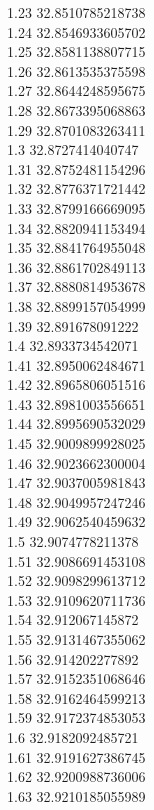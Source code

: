 {1.23	32.8510785218738\\
1.24	32.8546933605702\\
1.25	32.8581138807715\\
1.26	32.8613535375598\\
1.27	32.8644248595675\\
1.28	32.8673395068863\\
1.29	32.8701083263411\\
1.3	32.8727414040747\\
1.31	32.8752481154296\\
1.32	32.8776371721442\\
1.33	32.8799166669095\\
1.34	32.8820941153494\\
1.35	32.8841764955048\\
1.36	32.8861702849113\\
1.37	32.8880814953678\\
1.38	32.8899157054999\\
1.39	32.891678091222\\
1.4	32.8933734542071\\
1.41	32.8950062484671\\
1.42	32.8965806051516\\
1.43	32.8981003556651\\
1.44	32.8995690532029\\
1.45	32.9009899928025\\
1.46	32.9023662300004\\
1.47	32.9037005981843\\
1.48	32.9049957247246\\
1.49	32.9062540459632\\
1.5	32.9074778211378\\
1.51	32.9086691453108\\
1.52	32.9098299613712\\
1.53	32.9109620711736\\
1.54	32.912067145872\\
1.55	32.9131467355062\\
1.56	32.914202277892\\
1.57	32.9152351068646\\
1.58	32.9162464599213\\
1.59	32.9172374853053\\
1.6	32.9182092485721\\
1.61	32.9191627386745\\
1.62	32.9200988736006\\
1.63	32.9210185055989\\
}
